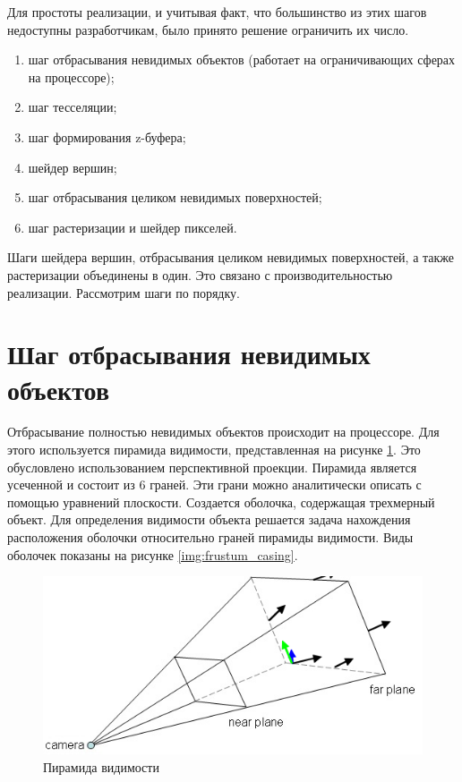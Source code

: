 Для простоты реализации, и учитывая факт, что большинство из этих шагов недоступны разработчикам, было принято решение ограничить их число. 


\begin{enumerate}
 \item шаг отбрасывания невидимых объектов (работает на ограничивающих сферах на процессоре);
 \item шаг тесселяции;
 \item шаг формирования z-буфера;
 \item шейдер вершин;
 \item шаг отбрасывания целиком невидимых поверхностей;
 \item шаг растеризации и шейдер пикселей.
\end{enumerate}


Шаги шейдера вершин, отбрасывания целиком невидимых поверхностей, а также растеризации объединены в один. Это связано с производительностью реализации.
Рассмотрим шаги по порядку.

\section{Шаг отбрасывания невидимых объектов}

Отбрасывание полностью невидимых объектов происходит на процессоре. Для этого используется пирамида видимости, представленная на 
рисунке \ref{img:frustum_view}. Это обусловлено использованием перспективной проекции. Пирамида является усеченной и состоит из 6 граней.
Эти грани можно аналитически описать с помощью уравнений плоскости. Создается оболочка, содержащая трехмерный объект.
Для определения видимости объекта решается задача нахождения расположения оболочки относительно граней пирамиды видимости.
Виды оболочек показаны на рисунке \ref{img:frustum_casing}.

\begin{figure}[H]
	\begin{center}
		\includegraphics[scale=0.88]{img/frust_1.png}
	\end{center}
	\captionsetup{justification=centering}
	\caption{Пирамида видимости}
	\label{img:frustum_view}
\end{figure}

